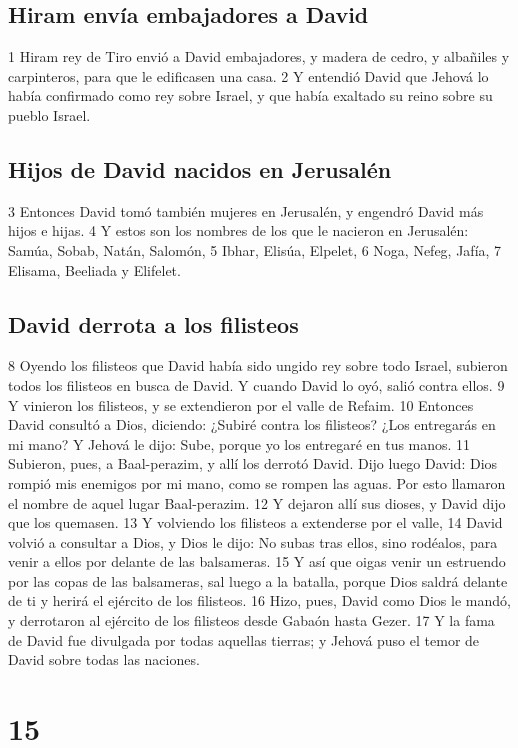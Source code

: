 \section*{Hiram envía embajadores a David}

 

1 Hiram rey de Tiro envió a David embajadores, y madera de cedro, y albañiles y carpinteros, para que le edificasen una casa.
2 Y entendió David que Jehová lo había confirmado como rey sobre Israel, y que había exaltado su reino sobre su pueblo Israel.
\section*{Hijos de David nacidos en Jerusalén}


3 Entonces David tomó también mujeres en Jerusalén, y engendró David más hijos e hijas.
4 Y estos son los nombres de los que le nacieron en Jerusalén: Samúa, Sobab, Natán, Salomón,
5 Ibhar, Elisúa, Elpelet,
6 Noga, Nefeg, Jafía,
7 Elisama, Beeliada y Elifelet.
\section*{David derrota a los filisteos}

 
8 Oyendo los filisteos que David había sido ungido rey sobre todo Israel, subieron todos los filisteos en busca de David. Y cuando David lo oyó, salió contra ellos.
9 Y vinieron los filisteos, y se extendieron por el valle de Refaim.
10 Entonces David consultó a Dios, diciendo: ¿Subiré contra los filisteos? ¿Los entregarás en mi mano? Y Jehová le dijo: Sube, porque yo los entregaré en tus manos.
11 Subieron, pues, a Baal-perazim, y allí los derrotó David. Dijo luego David: Dios rompió mis enemigos por mi mano, como se rompen las aguas. Por esto llamaron el nombre de aquel lugar Baal-perazim.
12 Y dejaron allí sus dioses, y David dijo que los quemasen.
13 Y volviendo los filisteos a extenderse por el valle,
14 David volvió a consultar a Dios, y Dios le dijo: No subas tras ellos, sino rodéalos, para venir a ellos por delante de las balsameras.
15 Y así que oigas venir un estruendo por las copas de las balsameras, sal luego a la batalla, porque Dios saldrá delante de ti y herirá el ejército de los filisteos.
16 Hizo, pues, David como Dios le mandó, y derrotaron al ejército de los filisteos desde Gabaón hasta Gezer.
17 Y la fama de David fue divulgada por todas aquellas tierras; y Jehová puso el temor de David sobre todas las naciones. 


\chapter{15}

